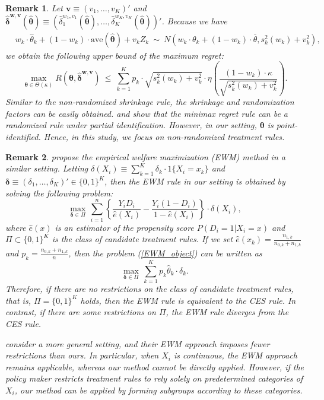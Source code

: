 \documentclass[12pt,a4paper]{article}
\newtheorem{Remark}{Remark}
\begin{document}
\begin{Remark}
Let $\bm{v} \equiv (v_1, \ldots , v_K)'$ and $\hat{\bm{\delta}}^{\bm{w}, \bm{v}}(\hat{\bm{\theta}}) \equiv \left( \hat{\delta}_{1}^{w_1, v_1}(\hat{\bm{\theta}}), \ldots, \hat{\delta}_{K}^{w_K, v_K}(\hat{\bm{\theta}})  \right)'$. Because we have
\begin{eqnarray*}
& w_k \cdot \hat{\theta}_k + (1-w_k) \cdot \mathrm{ave}(\hat{\bm{\theta}}) + v_k Z_k \ \sim \ N \left( w_k \cdot \theta_k + (1-w_k) \cdot \overline{\theta}, s_k^2(w_k) + v_k^2 \right),
\end{eqnarray*}
we obtain the following upper bound of the maximum regret:
\begin{equation}
\max_{\bm{\theta} \in \Theta(\kappa)} R(\bm{\theta}, \hat{\bm{\delta}}^{\bm{w},\bm{v}}) \ \leq \ \sum_{k=1}^K p_k \cdot \sqrt{s_k^2(w_k)+v_k^2} \cdot \eta \left( \frac{(1-w_k) \cdot \kappa}{\sqrt{s_k^2(w_k)+v_k^2}} \right). \nonumber
\end{equation}
Similar to the non-randomized shrinkage rule, the shrinkage and randomization factors can be easily obtained. \cite{olea2023decision} and \cite{yata2021optimal} show that the minimax regret rule can be a randomized rule under partial identification. However, in our setting, $\bm{\theta}$ is point-identified. Hence, in this study, we focus on non-randomized treatment rules.
\end{Remark}

\begin{Remark}\label{rem:EWM}
\cite{kitagawa2018should} propose the empirical welfare maximization (EWM) method in a similar setting. Letting $\delta(X_i) \equiv \sum_{k=1}^K \delta_k \cdot 1\{X_i = x_k\}$ and $\bm{\delta} \equiv (\delta_1, \ldots, \delta_K)' \in \{0,1\}^{K}$, then the EWM rule in our setting is obtained by solving the following problem:
\begin{equation}
\max_{\bm{\delta} \in \Pi} \, \sum_{i=1}^n \left\{ \frac{Y_i D_i}{\hat{e}(X_i)} -  \frac{Y_i (1-D_i)}{1-\hat{e}(X_i)} \right\} \cdot \delta(X_i), \label{EWM_object}
\end{equation}
where $\hat{e}(x)$ is an estimator of the propensity score $P(D_i=1|X_i=x)$ and $\Pi \subset \{0,1\}^K$ is the class of candidate treatment rules. If we set $\hat{e}(x_k) = \frac{n_{1,k}}{n_{0,k}+n_{1,k}}$ and $p_k = \frac{n_{0,k}+n_{1,k}}{n}$, then the problem (\ref{EWM_object}) can be written as
\[
\max_{\bm{\delta} \in \Pi} \, \sum_{k=1}^K p_k \hat{\theta}_k \cdot \delta_k.
\]
Therefore, if there are no restrictions on the class of candidate treatment rules, that is, $\Pi = \{0,1\}^K$ holds, then the EWM rule is equivalent to the CES rule. In contrast, if there are some restrictions on $\Pi$, the EWM rule diverges from the CES rule.

\cite{kitagawa2018should} consider a more general setting, and their EWM approach imposes fewer restrictions than ours. In particular, when $X_i$ is continuous, the EWM approach remains applicable, whereas our method cannot be directly applied. However, if the policy maker restricts treatment rules to rely solely on predetermined categories of $X_i$, our method can be applied by forming subgroups according to these categories.
\end{Remark}
\end{document}
